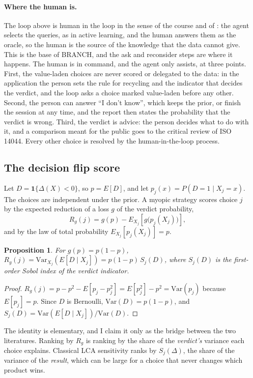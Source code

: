 \documentclass{article}
\newtheorem{proposition}{Proposition}
\begin{document}
\paragraph{Where the human is.}\label{sec:roles}
The loop above is human in the loop in the sense of the course and of \citet{munro2021}: the agent
selects the queries, as in active learning, and the human answers them as the oracle, so the human is the
source of the knowledge that the data cannot give. This is the base of BRANCH, and the ask and reconsider
steps are where it happens. The human is in command, and the agent only assists, at three points. First,
the value-laden choices are never scored or delegated to the data: in the application the person sets the
rule for recycling and the indicator that decides the verdict, and the loop asks a choice marked value-laden
before any other. Second, the person can answer ``I don't know'', which keeps the prior, or finish the session at
any time, and the report then states the probability that the verdict is wrong. Third, the verdict is
advice: the person decides what to do with it, and a comparison meant for the public goes to the critical
review of ISO 14044. Every other choice is resolved by the human-in-the-loop process.

\subsection{The decision flip score}\label{sec:lemma}

Let $D=\mathbf{1}\{\Delta(X)<0\}$, so $p=E[D]$, and let $p_j(x)=P(D=1\mid X_j=x)$. The choices are
independent under the prior. A myopic strategy
scores choice $j$ by the expected reduction of a loss $g$ of the verdict probability,
\[
R_g(j)=g(p)-E_{X_j}\!\left[g\big(p_j(X_j)\big)\right],
\]
and by the law of total probability $E_{X_j}[p_j(X_j)]=p$.

\begin{proposition}\label{prop:sobol}
For $g(p)=p(1-p)$, $R_g(j)=\mathrm{Var}_{X_j}\!\left(E[D\mid X_j]\right)=p(1-p)\,S_j(D)$, where
$S_j(D)$ is the first-order Sobol index of the verdict indicator.
\end{proposition}
\begin{proof}
$R_g(j)=p-p^2-E[p_j-p_j^2]=E[p_j^2]-p^2=\mathrm{Var}(p_j)$ because $E[p_j]=p$. Since $D$ is Bernoulli,
$\mathrm{Var}(D)=p(1-p)$, and $S_j(D)=\mathrm{Var}(E[D\mid X_j])/\mathrm{Var}(D)$.
\end{proof}

The identity is elementary, and I claim it only as the bridge between the two literatures. Ranking by
$R_g$ is ranking by the share of the \emph{verdict's} variance each choice explains. Classical LCA
sensitivity ranks by $S_j(\Delta)$, the share of the variance of the \emph{result}, which can be large for
a choice that never changes which product wins.
\end{document}
